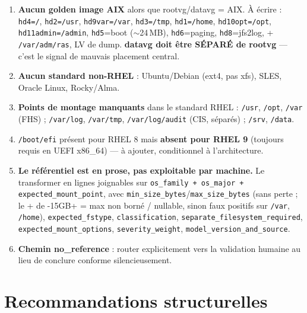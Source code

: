 \documentclass[11pt,a4paper]{article}
\newcommand{\code}[1]{\texttt{#1}}
\begin{document}
\begin{enumerate}[label=\textbf{\arabic*.}]
  \item \textbf{Aucun golden image AIX} alors que rootvg/datavg = AIX. \`A \'ecrire :
        \code{hd4=/}, \code{hd2=/usr}, \code{hd9var=/var}, \code{hd3=/tmp}, \code{hd1=/home},
        \code{hd10opt=/opt}, \code{hd11admin=/admin}, \code{hd5}=boot ($\sim$24\,MB),
        \code{hd6}=paging, \code{hd8}=jfs2log, + \code{/var/adm/ras}, LV de dump.
        \textbf{datavg doit \^etre S\'EPAR\'E de rootvg} --- c'est le signal de mauvais placement central.
  \item \textbf{Aucun standard non-RHEL} : Ubuntu/Debian (ext4, pas xfs), SLES, Oracle Linux, Rocky/Alma.
  \item \textbf{Points de montage manquants} dans le standard RHEL : \code{/usr}, \code{/opt},
        \code{/var} (FHS) ; \code{/var/log}, \code{/var/tmp}, \code{/var/log/audit} (CIS, s\'epar\'es) ;
        \code{/srv}, \code{/data}.
  \item \code{/boot/efi} pr\'esent pour RHEL 8 mais \textbf{absent pour RHEL 9} (toujours requis en
        UEFI x86\_64) --- \`a ajouter, conditionnel \`a l'architecture.
  \item \textbf{Le r\'ef\'erentiel est en prose, pas exploitable par machine.} Le transformer en lignes
        joignables sur \code{os\_family + os\_major + expected\_mount\_point}, avec
        \code{min\_size\_bytes}/\code{max\_size\_bytes} (sans perte ; le \og +\fg{} de -15GB+\fg{}
        = max non born\'e / nullable, sinon faux positifs sur \code{/var}, \code{/home}),
        \code{expected\_fstype}, \code{classification}, \code{separate\_filesystem\_required},
        \code{expected\_mount\_options}, \code{severity\_weight}, \code{model\_version\_and\_source}.
  \item \textbf{Chemin \og no\_reference\fg{}} : router explicitement vers la validation humaine
        au lieu de conclure \og conforme\fg{} silencieusement.
\end{enumerate}

\section{Recommandations structurelles}
\end{document}
